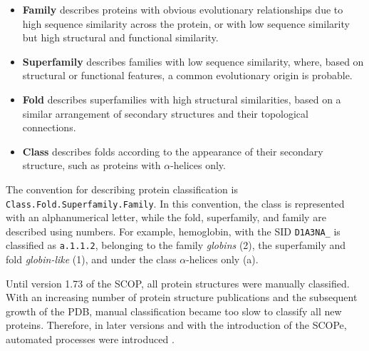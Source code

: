 \begin{itemize}
\item \textbf{Family} describes proteins with obvious evolutionary relationships due to high sequence similarity across the protein, or with low sequence similarity but high structural and functional similarity. 

\item \textbf{Superfamily} describes families with low sequence similarity, where, based on structural or functional features, a common evolutionary origin is probable.  

\item \textbf{Fold} describes superfamilies with high structural similarities, based on a similar arrangement of secondary structures and their topological connections.  

\item \textbf{Class} describes folds according  to the appearance of their secondary structure, such as proteins with $\alpha$-helices only. 
\end{itemize}


 
The convention for describing protein classification is \texttt{Class.Fold.Superfamily.Family}. In this convention, the class is represented with an alphanumerical letter, while the fold, superfamily, and family are described using numbers. For example, hemoglobin, with the \ac{SID} \texttt{D1A3NA\_} is classified as \texttt{a.1.1.2}, belonging to the family \textit{globins} (2), the superfamily and fold \textit{globin-like} (1), and under the class $\alpha$-helices only (a). 


Until version 1.73 of the \ac{SCOP}, all protein structures were manually classified. With an increasing number of protein structure publications and the subsequent growth of the \ac{PDB}, manual classification became too slow to classify all new proteins.  
Therefore, in later versions and with the introduction of the \ac{SCOPe}, automated processes were introduced \cite{Fox.2014b}.

